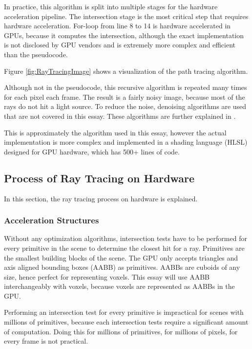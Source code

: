\documentclass[12pt]{article}
\begin{document}
In practice, this algorithm is split into multiple stages for the hardware acceleration pipeline.
The intersection stage is the most critical step that requires hardware acceleration.
For-loop from line 8 to 14 is hardware accelerated in GPUs, because it computes the intersection, although the exact implementation is not disclosed by GPU vendors and is extremely more complex and efficient than the pseudocode. \parencite[Part~5]{NVIDIA:RTGems2}

Figure \ref{fig:RayTracingImage} shows a visualization of the path tracing algorithm.

Although not in the pseudocode, this recursive algorithm is repeated many times for each pixel each frame. The result is a fairly noisy image, because most of the rays do not hit a light source. To reduce the noise, denoising algorithms are used that are not covered in this essay. These algorithms are further explained in \parencite{NVIDIA:RTGems2}.

This is approximately the algorithm used in this essay, however the actual implementation is more complex and implemented in a shading language (HLSL) designed for GPU hardware, which has 500+ lines of code.

\subsection{Process of Ray Tracing on Hardware}
In this section, the ray tracing process on hardware is explained.

\subsubsection{Acceleration Structures}

Without any optimization algorithms, intersection tests have to be performed for every primitive in the scene to determine the closest hit for a ray.
Primitives are the smallest building blocks of the scene. The GPU only accepts triangles and axis aligned bounding boxes (AABB) as primitives.
AABBs are cuboids of any size, hence perfect for representing voxels.
This essay will use AABB interchangeably with voxels, because voxels are represented as AABBs in the GPU.

Performing an intersection test for every primitive is impractical for scenes with millions of primitives, because each intersection tests require a significant amount of computation.
Doing this for millions of primitives, for millions of pixels, for every frame is not practical.
\end{document}

